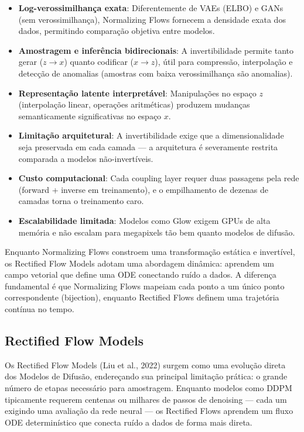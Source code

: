 \documentclass{tufte-handout}
\begin{document}
\begin{itemize}
    \item \textbf{Log-verossimilhança exata}: Diferentemente de VAEs (ELBO) e GANs (sem verossimilhança), Normalizing Flows fornecem a densidade exata dos dados, permitindo comparação objetiva entre modelos.
    \item \textbf{Amostragem e inferência bidirecionais}: A invertibilidade permite tanto gerar ($z \rightarrow x$) quanto codificar ($x \rightarrow z$), útil para compressão, interpolação e detecção de anomalias (amostras com baixa verossimilhança são anomalias).
    \item \textbf{Representação latente interpretável}: Manipulações no espaço $z$ (interpolação linear, operações aritméticas) produzem mudanças semanticamente significativas no espaço $x$.
    \item \textbf{Limitação arquitetural}: A invertibilidade exige que a dimensionalidade seja preservada em cada camada --- a arquitetura é severamente restrita comparada a modelos não-invertíveis.
    \item \textbf{Custo computacional}: Cada coupling layer requer duas passagens pela rede (forward + inverse em treinamento), e o empilhamento de dezenas de camadas torna o treinamento caro.
    \item \textbf{Escalabilidade limitada}: Modelos como Glow exigem GPUs de alta memória e não escalam para megapixels tão bem quanto modelos de difusão.
\end{itemize}

\medskip
\noindent Enquanto Normalizing Flows constroem uma transformação estática e invertível, os Rectified Flow Models adotam uma abordagem dinâmica: aprendem um campo vetorial que define uma ODE conectando ruído a dados. A diferença fundamental é que Normalizing Flows mapeiam cada ponto a um único ponto correspondente (bijection), enquanto Rectified Flows definem uma trajetória contínua no tempo.

\subsection{Rectified Flow Models}

Os Rectified Flow Models (Liu et al., 2022) surgem como uma evolução direta dos Modelos de Difusão, endereçando sua principal limitação prática: o grande número de etapas necessário para amostragem. Enquanto modelos como DDPM tipicamente requerem centenas ou milhares de passos de denoising --- cada um exigindo uma avaliação da rede neural --- os Rectified Flows aprendem um fluxo ODE determinístico que conecta ruído a dados de forma mais direta.
\end{document}
